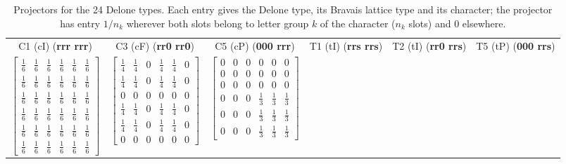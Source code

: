 \documentclass[preprint]{iucr}              %
\newcommand{\charseq}[1]{({\bf #1})}
\begin{document}
	\begin{table}
		\caption{Projectors for the 24 Delone types. Each entry gives the
			Delone type, its Bravais lattice type and its character; the
			projector has entry $1/n_k$ wherever both slots belong to letter
			group $k$ of the character ($n_k$ slots) and 0 elsewhere.}
		\label{table:DeloneTypes}
		\centering
		\setlength{\arraycolsep}{2pt}
		\setlength{\tabcolsep}{4pt}
		\renewcommand{\arraystretch}{1.3}
		\begin{tabular}{cccccc}
			\toprule
			C1 (cI) \charseq{rrr rrr} & C3 (cF) \charseq{rr0 rr0} & C5 (cP) \charseq{000 rrr} & T1 (tI) \charseq{rrs rrs} & T2 (tI) \charseq{rr0 rrs} & T5 (tP) \charseq{000 rrs} \\[2pt]
			$\begin{bmatrix} \tfrac{1}{6} & \tfrac{1}{6} & \tfrac{1}{6} & \tfrac{1}{6} & \tfrac{1}{6} & \tfrac{1}{6} \\ \tfrac{1}{6} & \tfrac{1}{6} & \tfrac{1}{6} & \tfrac{1}{6} & \tfrac{1}{6} & \tfrac{1}{6} \\ \tfrac{1}{6} & \tfrac{1}{6} & \tfrac{1}{6} & \tfrac{1}{6} & \tfrac{1}{6} & \tfrac{1}{6} \\ \tfrac{1}{6} & \tfrac{1}{6} & \tfrac{1}{6} & \tfrac{1}{6} & \tfrac{1}{6} & \tfrac{1}{6} \\ \tfrac{1}{6} & \tfrac{1}{6} & \tfrac{1}{6} & \tfrac{1}{6} & \tfrac{1}{6} & \tfrac{1}{6} \\ \tfrac{1}{6} & \tfrac{1}{6} & \tfrac{1}{6} & \tfrac{1}{6} & \tfrac{1}{6} & \tfrac{1}{6} \end{bmatrix}$ &
			$\begin{bmatrix} \tfrac{1}{4} & \tfrac{1}{4} & 0 & \tfrac{1}{4} & \tfrac{1}{4} & 0 \\ \tfrac{1}{4} & \tfrac{1}{4} & 0 & \tfrac{1}{4} & \tfrac{1}{4} & 0 \\ 0 & 0 & 0 & 0 & 0 & 0 \\ \tfrac{1}{4} & \tfrac{1}{4} & 0 & \tfrac{1}{4} & \tfrac{1}{4} & 0 \\ \tfrac{1}{4} & \tfrac{1}{4} & 0 & \tfrac{1}{4} & \tfrac{1}{4} & 0 \\ 0 & 0 & 0 & 0 & 0 & 0 \end{bmatrix}$ &
			$\begin{bmatrix} 0 & 0 & 0 & 0 & 0 & 0 \\ 0 & 0 & 0 & 0 & 0 & 0 \\ 0 & 0 & 0 & 0 & 0 & 0 \\ 0 & 0 & 0 & \tfrac{1}{3} & \tfrac{1}{3} & \tfrac{1}{3} \\ 0 & 0 & 0 & \tfrac{1}{3} & \tfrac{1}{3} & \tfrac{1}{3} \\ 0 & 0 & 0 & \tfrac{1}{3} & \tfrac{1}{3} & \tfrac{1}{3} \end{bmatrix}$ &

\end{tabular}
\end{table}
\end{document}
